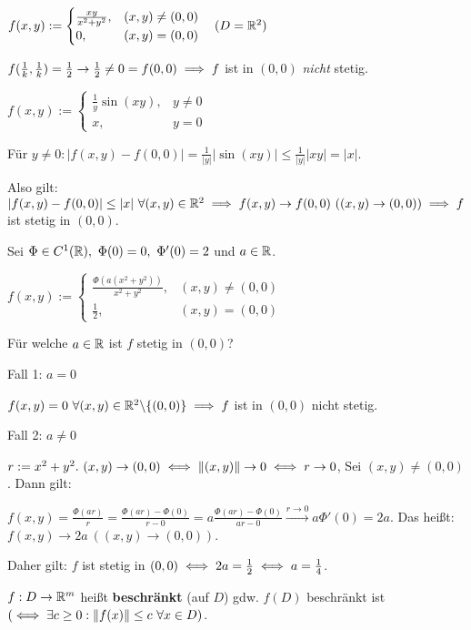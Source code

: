 \documentclass[a4paper,oneside,DIV15,BCOR12mm,chapterprefix=true,headings=onelinechapter]{scrbook}
\begin{document}
\begin{beispiele}
\item $f(x,y) := \begin{cases}
\frac{xy}{x^2+y^2}, & (x,y) \ne (0,0)\\
0,                  & (x,y) = (0,0)
\end{cases}\quad(D = \mathbb{R}^2)$

$f(\frac{1}{k},\frac{1}{k}) = \frac{1}{2} \to \frac{1}{2} \ne 0 = f(0,0) \implies f$ ist in $(0,0)$ \emph{nicht} stetig.

\item $f(x,y) := \begin{cases}
\frac{1}{y} \sin(xy), & y \ne 0\\
x,                    & y = 0
\end{cases}$

Für $y \ne 0: |f(x,y) - f(0,0)| = \frac{1}{|y|}|\sin(xy)| \le \frac{1}{|y|}|xy| = |x|.$

Also gilt: $|f(x,y) - f(0,0)| \le |x|\ \forall (x,y) \in \MdR^2 \folgt f(x,y) \to f(0,0)\ ((x,y) \to (0,0)) \folgt f$ ist stetig in $(0,0)$.

\item Sei $\Phi \in C^1(\MdR),\ \Phi(0) = 0,\ \Phi'(0) = 2$ und $a \in \mathbb{R}$.

$f(x,y) := \begin{cases}
\frac{\Phi(a(x^2+y^2))}{x^2+y^2}, & (x,y) \ne (0,0)\\
\frac{1}{2},                      & (x,y) = (0,0)
\end{cases}$

Für welche $a \in \mathbb{R}$ ist $f$ stetig in $(0,0)$?

Fall 1: $a = 0$

$f(x,y) = 0\ \forall(x,y) \in \mathbb{R}^2\backslash\{(0,0)\} \implies f$ ist in $(0,0)$ nicht stetig.

Fall 2: $a \ne 0$

$r := x^2 + y^2.\ (x,y) \to (0,0) \iff \|(x,y)\| \to 0 \iff r \to 0$, Sei $(x,y) \ne (0,0)$. Dann gilt:

$f(x,y) = \frac{\Phi(ar)}{r} = \frac{\Phi(ar) - \Phi(0)}{r - 0} = a \frac{\Phi(ar) - \Phi(0)}{ar - 0} \overset{r \to 0}{\to} a \Phi'(0) = 2a$. Das heißt: $f(x,y) \to 2a\ ((x,y)\to(0,0))$.

Daher gilt: $f$ ist stetig in $(0,0) \iff 2a = \frac{1}{2} \iff a = \frac{1}{4}$.
\end{beispiele}

\begin{definition*}
$f:D \to \mathbb{R}^m$ heißt \textbf{beschränkt} (auf $D$) gdw. $f(D)$ beschränkt ist $(\iff \exists c \ge 0: \|f(x)\| \le c\ \forall x \in D)$.
\end{definition*}
\end{document}
